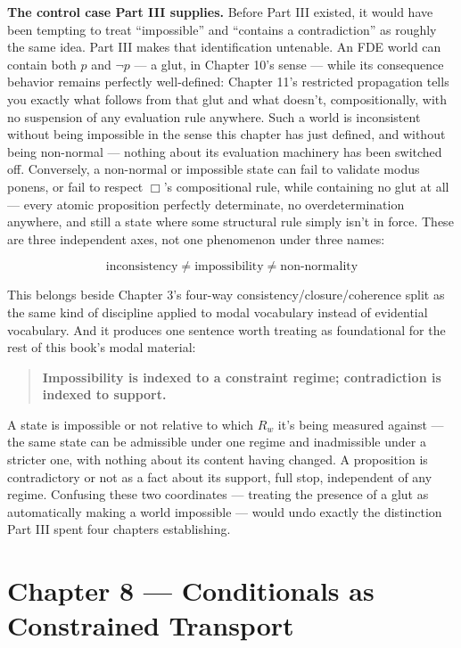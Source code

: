 \textbf{The control case Part III supplies.} Before Part III existed, it
would have been tempting to treat ``impossible'' and ``contains a
contradiction'' as roughly the same idea. Part III makes that identification
untenable. An FDE world can contain both \(p\) and \(\neg p\) --- a glut, in
Chapter 10's sense --- while its consequence behavior remains perfectly
well-defined: Chapter 11's restricted propagation tells you exactly what
follows from that glut and what doesn't, compositionally, with no
suspension of any evaluation rule anywhere. Such a world is inconsistent
without being impossible in the sense this chapter has just defined, and
without being non-normal --- nothing about its evaluation machinery has
been switched off. Conversely, a non-normal or impossible state can fail
to validate modus ponens, or fail to respect \(\Box\)'s compositional rule,
while containing no glut at all --- every atomic proposition perfectly
determinate, no overdetermination anywhere, and still a state where some
structural rule simply isn't in force. These are three independent axes,
not one phenomenon under three names:

\[\boxed{\text{inconsistency} \neq \text{impossibility} \neq \text{non-normality}}\]

This belongs beside Chapter 3's four-way consistency/closure/coherence
split as the same kind of discipline applied to modal vocabulary instead
of evidential vocabulary. And it produces one sentence worth treating as
foundational for the rest of this book's modal material:

\begin{quote}
\textbf{Impossibility is indexed to a constraint regime; contradiction is
indexed to support.}
\end{quote}

A state is impossible or not relative to which \(R_w\) it's being measured
against --- the same state can be admissible under one regime and
inadmissible under a stricter one, with nothing about its content having
changed. A proposition is contradictory or not as a fact about its
support, full stop, independent of any regime. Confusing these two
coordinates --- treating the presence of a glut as automatically making a
world impossible --- would undo exactly the distinction Part III spent
four chapters establishing.

\hypertarget{chapter-8-conditionals-as-constrained-transport}{%
\chapter*{Chapter 8 --- Conditionals as Constrained Transport}
\label{chapter-8-conditionals-as-constrained-transport}}

